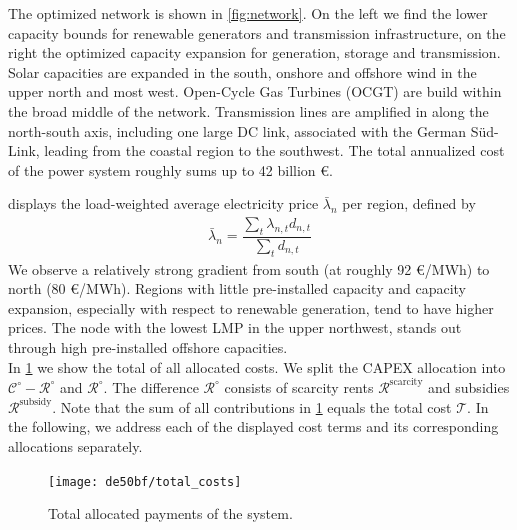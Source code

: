 \documentclass[11pt,twocolumn]{article}
\newcommand{\lmp}[1][n]{\lambda_{#1,t}}
\newcommand{\averagelmp}{\bar{\lambda}_n}
\newcommand{\demand}[1][n]{d_{#1,t}}
\newcommand{\totalcost}{\mathcal{T}}
\newcommand{\cost}[1][\circ]{\mathcal{C}^{#1}}
\newcommand{\remainingcost}{\mathcal{R}}
\newcommand{\scarcitycost}{\remainingcost^\text{scarcity}}
\newcommand{\subsidycost}{\remainingcost^\text{subsidy}}
\begin{document}
The optimized network is shown in  \cref{fig:network}. On the left we find the lower capacity bounds for renewable generators and transmission infrastructure, on the right the optimized capacity expansion for generation, storage and transmission. Solar capacities are expanded in the south, onshore and offshore wind in the upper north and most west. Open-Cycle Gas Turbines (OCGT) are build within the broad middle of the network. Transmission lines are amplified in along the north-south axis, including one large DC link, associated with the German S\"ud-Link, leading from the coastal region to the southwest. 
The total annualized cost of the power system roughly sums up to 42 billion \euro.
% 

 displays the load-weighted average electricity price $\averagelmp$ per region, defined by 
\begin{align}
    \averagelmp = \dfrac{\sum_{t} \lmp \demand}{\sum_t \demand}    
\end{align}
We observe a relatively strong gradient from south (at roughly 92 \euro/MWh) to north (80 \euro/MWh). Regions with little pre-installed capacity and capacity expansion, especially with respect to renewable generation, tend to have higher prices. The node with the lowest LMP in the upper northwest, stands out through high pre-installed offshore capacities. \\
 
In \cref{fig:total_cost} we show the total of all allocated costs. We split the CAPEX allocation into $\cost - \remainingcost^\circ$ and $\remainingcost^\circ$. The difference $\remainingcost^\circ$ consists of scarcity rents $\scarcitycost$ and subsidies $\subsidycost$. Note that the sum of all contributions in \cref{fig:total_cost} equals the total cost $\totalcost$.  
In the following, we address each of the displayed cost terms and its corresponding allocations separately.   

\begin{figure}
    \centering
    \texttt{[image: de50bf/total\_costs]}
    \caption{Total allocated payments of the system. }
    \label{fig:total_cost}
\end{figure}
\end{document}
